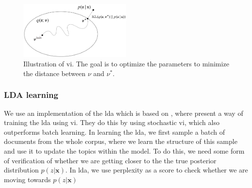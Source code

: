 \begin{figure}
	\centering
	\includegraphics[width=0.5\textwidth]{figures/vi_illustration.png}
	\caption[Caption for LOF]{Illustration of \acrlong{vi}\footnotemark. The goal is to optimize the parameters to minimize the distance between $\nu$ and $\nu^*$.}
	\label{fig:vi}
\end{figure}

\subsubsection*{LDA learning}
We use an implementation of the \gls{lda} which is based on \cite{blei2010online}, where \citeauthor{blei2010online} present a way of training the \gls{lda} using \gls{vi}.
They do this by using stochastic \gls{vi}, which also outperforms batch learning.
In learning the \gls{lda}, we first sample a batch of documents from the whole corpus, where we learn the structure of this sample and use it to update the topics within the model.
To do this, we need some form of verification of whether we are getting closer to the the true posterior distribution $p(z|\textbf{x})$.
In \gls{lda}, we use perplexity as a score to check whether we are moving towards $p(z|\textbf{x})$
